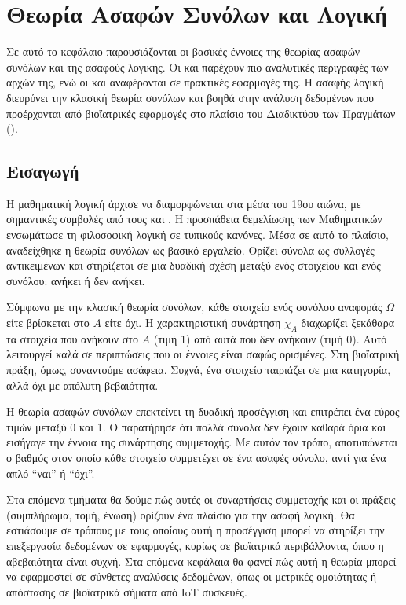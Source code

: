 \chapter{Θεωρία Ασαφών Συνόλων και Λογική}
\label{chap3}
Σε αυτό το κεφάλαιο παρουσιάζονται οι βασικές έννοιες της θεωρίας ασαφών συνόλων και της ασαφούς λογικής.
Οι  και  \cite{KlirYuan} παρέχουν πιο αναλυτικές περιγραφές των αρχών της, ενώ οι  και  \cite{Nguyen} αναφέρονται σε πρακτικές εφαρμογές της. 
Η ασαφής λογική διευρύνει την κλασική θεωρία συνόλων και βοηθά στην ανάλυση δεδομένων που προέρχονται από βιοϊατρικές εφαρμογές στο πλαίσιο του Διαδικτύου των Πραγμάτων ().

\section{Εισαγωγή}

Η μαθηματική λογική άρχισε να διαμορφώνεται στα μέσα του 19ου αιώνα, με σημαντικές συμβολές από τους  και . Η προσπάθεια θεμελίωσης των Μαθηματικών ενσωμάτωσε τη φιλοσοφική λογική σε τυπικούς κανόνες. Μέσα σε αυτό το πλαίσιο, αναδείχθηκε η θεωρία συνόλων ως βασικό εργαλείο. Ορίζει σύνολα ως συλλογές αντικειμένων και στηρίζεται σε μια δυαδική σχέση μεταξύ ενός στοιχείου και ενός συνόλου: ανήκει ή δεν ανήκει.

Σύμφωνα με την κλασική θεωρία συνόλων, κάθε στοιχείο ενός συνόλου αναφοράς \(\Omega\) είτε βρίσκεται στο \(A\) είτε όχι. Η χαρακτηριστική συνάρτηση \(\chi_A\) διαχωρίζει ξεκάθαρα τα στοιχεία που ανήκουν στο \(A\) (τιμή 1) από αυτά που δεν ανήκουν (τιμή 0). Αυτό λειτουργεί καλά σε περιπτώσεις που οι έννοιες είναι σαφώς ορισμένες. Στη βιοϊατρική πράξη, όμως, συναντούμε ασάφεια. Συχνά, ένα στοιχείο ταιριάζει σε μια κατηγορία, αλλά όχι με απόλυτη βεβαιότητα.

Η θεωρία ασαφών συνόλων επεκτείνει τη δυαδική προσέγγιση και επιτρέπει ένα εύρος τιμών μεταξύ 0 και 1. Ο  \cite{Zadeh1965} παρατήρησε ότι πολλά σύνολα δεν έχουν καθαρά όρια και εισήγαγε την έννοια της συνάρτησης συμμετοχής. Με αυτόν τον τρόπο, αποτυπώνεται ο βαθμός στον οποίο κάθε στοιχείο συμμετέχει σε ένα ασαφές σύνολο, αντί για ένα απλό ``ναι'' ή ``όχι''.

Στα επόμενα τμήματα θα δούμε πώς αυτές οι συναρτήσεις συμμετοχής και οι πράξεις (συμπλήρωμα, τομή, ένωση) ορίζουν ένα πλαίσιο για την ασαφή λογική. Θα εστιάσουμε σε τρόπους με τους οποίους αυτή η προσέγγιση μπορεί να στηρίξει την επεξεργασία δεδομένων σε  εφαρμογές, κυρίως σε βιοϊατρικά περιβάλλοντα, όπου η αβεβαιότητα είναι συχνή.
Στα επόμενα κεφάλαια θα φανεί πώς αυτή η θεωρία μπορεί να εφαρμοστεί σε σύνθετες αναλύσεις δεδομένων, όπως οι μετρικές ομοιότητας ή απόστασης σε βιοϊατρικά σήματα από IoT συσκευές.

